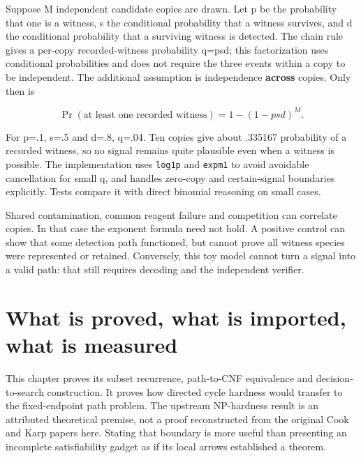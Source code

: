 
Suppose M independent candidate copies are drawn. Let p be the
probability that one is a witness, s the conditional probability that a
witness survives, and d the conditional probability that a surviving
witness is detected. The chain rule gives a per-copy recorded-witness
probability q=psd; this factorization uses conditional probabilities and
does not require the three events within a copy to be independent. The
additional assumption is independence \textbf{across} copies. Only then
is

\begin{equation}
\Pr(\text{at least one recorded witness})=1-(1-psd)^M.
\end{equation}

For p=.1, s=.5 and d=.8, q=.04. Ten copies give about .335167
probability of a recorded witness, so no signal remains quite plausible
even when a witness is possible. The implementation uses \texttt{log1p}
and \texttt{expm1} to avoid avoidable cancellation for small q, and
handles zero-copy and certain-signal boundaries explicitly. Tests
compare it with direct binomial reasoning on small cases.

Shared contamination, common reagent failure and competition can
correlate copies. In that case the exponent formula need not hold. A
positive control can show that some detection path functioned, but
cannot prove all witness species were represented or retained.
Conversely, this toy model cannot turn a signal into a valid path: that
still requires decoding and the independent verifier.

\section{What is proved, what is imported, what is
measured}\label{what-is-proved-what-is-imported-what-is-measured}


This chapter proves its subset recurrence, path-to-CNF equivalence and
decision-to-search construction. It proves how directed cycle hardness
would transfer to the fixed-endpoint path problem. The upstream
NP-hardness result is an attributed theoretical premise, not a proof
reconstructed from the original Cook and Karp papers here. Stating that
boundary is more useful than presenting an incomplete satisfiability
gadget as if its local arrows established a theorem.

